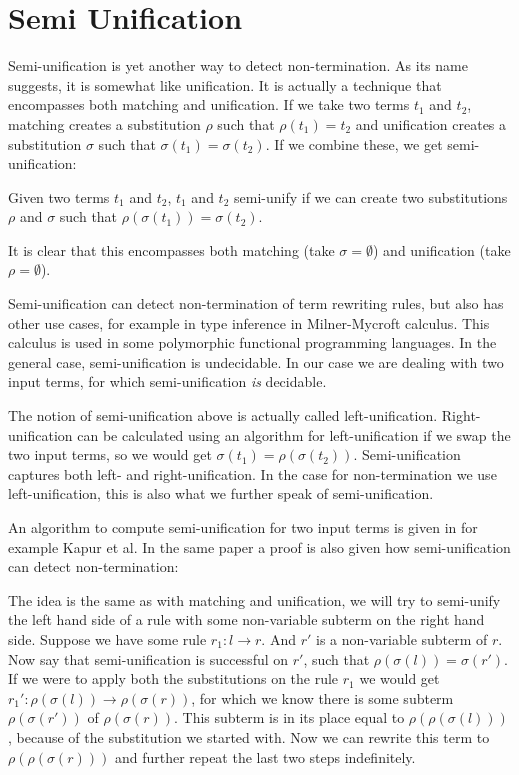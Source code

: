 \chapter{Semi Unification}\label{semi-unification}
Semi-unification is yet another way to detect non-termination. As its name suggests, it is somewhat like unification. It is actually a technique that encompasses both matching and unification. If we take two terms $t_1$ and $t_2$, matching creates a substitution $\rho$ such that $\rho(t_1) = t_2$ and unification creates a substitution $\sigma$ such that $\sigma(t_1) = \sigma(t_2)$. If we combine these, we get semi-unification:

\begin{definition}
Given two terms $t_1$ and $t_2$, $t_1$ and $t_2$ semi-unify if we can create two substitutions $\rho$ and $\sigma$ such that $\rho(\sigma(t_1)) = \sigma(t_2)$.
\end{definition}

It is clear that this encompasses both matching (take $\sigma = \emptyset$) and unification (take $\rho = \emptyset$). 

Semi-unification can detect non-termination of term rewriting rules, but also has other use cases, for example in type inference in Milner-Mycroft calculus\cite{Henglein:1988}. This calculus is used in some polymorphic functional programming languages. In the general case, semi-unification is undecidable\cite{KFOURY:1993}. In our case we are dealing with two input terms, for which semi-unification \textit{is} decidable.

The notion of semi-unification above is actually called left-unification. Right-unification can be calculated using an algorithm for left-unification if we swap the two input terms, so we would get $\sigma(t_1) = \rho(\sigma(t_2))$. Semi-unification captures both left- and right-unification. In the case for non-termination we use left-unification, this is also what we further speak of semi-unification.

An algorithm to compute semi-unification for two input terms is given in for example Kapur et al\cite{SemiUnification}. In the same paper a proof is also given how semi-unification can detect non-termination:

The idea is the same as with matching and unification, we will try to semi-unify the left hand side of a rule with some non-variable subterm on the right hand side. Suppose we have some rule $r_1: l \rightarrow r$. And $r'$ is a non-variable subterm of $r$. Now say that semi-unification is successful on $r'$, such that $\rho(\sigma(l)) = \sigma(r')$. If we were to apply both the substitutions on the rule $r_1$ we would get $r_1': \rho(\sigma(l)) \rightarrow \rho(\sigma(r))$, for which we know there is some subterm $\rho(\sigma(r'))$ of $\rho(\sigma(r))$. This subterm is in its place equal to $\rho(\rho(\sigma(l)))$, because of the substitution we started with. Now we can rewrite this term to $\rho(\rho(\sigma(r)))$ and further repeat the last two steps indefinitely.

